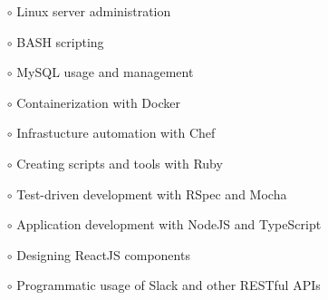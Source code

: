 \documentclass[12pt]{article}
\newenvironment{resblock}[1]
  {\noindent{\large\bf{#1}}}
  {\par\vspace{1em}}
\begin{document}

\setlength\multicolsep{0pt}
\begin{resblock}{Skills}
  \begin{changemargin}{0em}{0em}
  \begin{multicols}{3}\begin{flushleft}\begin{itemize}
    \item[$\circ$]Linux server \mbox{administration}
    \item[$\circ$]BASH scripting
    \item[$\circ$]MySQL usage and management%
    \item[$\circ$]Containerization with Docker\columnbreak
    \item[$\circ$]Infrastucture \mbox{automation} with Chef
    \item[$\circ$]Creating scripts and tools with Ruby
    \item[$\circ$]Test-driven development with RSpec and Mocha\columnbreak
    \item[$\circ$]Application development with NodeJS and TypeScript
    \item[$\circ$]Designing ReactJS components
    \item[$\circ$]Programmatic usage of Slack and  other RESTful APIs
  \end{itemize}\end{flushleft}\end{multicols}
  \end{changemargin}
\end{resblock}
\end{document}
